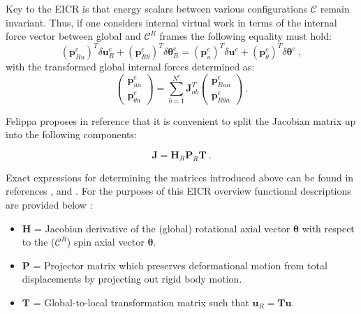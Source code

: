 Key to the EICR is that energy scalars between various configurations $\mathscr{C}$ remain invariant. Thus, if one considers internal virtual work in terms of the internal force vector between global and $\mathscr{C}^R$ frames the following equality must hold:
\begin{equation} 
(\mathbf{p}_{Ru}^{e})^T  \delta \mathbf{u}_{R}^e +
(\mathbf{p}_{R\theta}^{e})^T \delta \boldsymbol{\theta}_{R}^e =
(\mathbf{p}_{u}^{e})^T  \delta \mathbf{u}_{}^e +
(\mathbf{p}_{\theta}^{e})^T \delta \boldsymbol{\theta}_{}^e
\label{eq_cr7}\ ,
\end{equation}
with the transformed global internal forces determined as:
\begin{equation} 
\begin{pmatrix}
\mathbf{p}_{ua}^e \\
\mathbf{p}_{\theta a}^e 
\end{pmatrix}
=
\sum_{b=1}^{N^e}
\mathbf{J}_{ab}^T
\begin{pmatrix}
\mathbf{p}_{Rua}^e \\
\mathbf{p}_{R\theta a}^e 
\end{pmatrix}
\label{eq_cr8}\ .
\end{equation}

Felippa proposes in reference \cite{felippa2005unified} that it is convenient to split the Jacobian matrix up into the following components:

\begin{equation} 
\mathbf{J}
= \mathbf{H}_R 
\mathbf{P}_R 
\mathbf{T}
\label{eq_cr9}\ .
\end{equation}

Exact expressions for determining the matrices introduced above can be found in references \cite{felippa2005unified}, \cite{felippa2000systematic} and \cite{FelippaCR1_2016}. For the purposes of this EICR overview functional descriptions are provided below \cite{felippa2005unified}:

\begin{itemize}
	\item $\mathbf{H}$ = Jacobian derivative of the (global) rotational axial vector $\boldsymbol{\theta}$ with respect to the ($\mathscr{C}^R$) spin axial vector $\boldsymbol{\theta}$.
	\item $\mathbf{P}$ = Projector matrix which preserves deformational motion from total displacements by projecting out rigid body motion.
	\item $\mathbf{T}$ = Global-to-local transformation matrix such that $\mathbf{u}_R = \mathbf{T} \mathbf{u}$.
\end{itemize}

